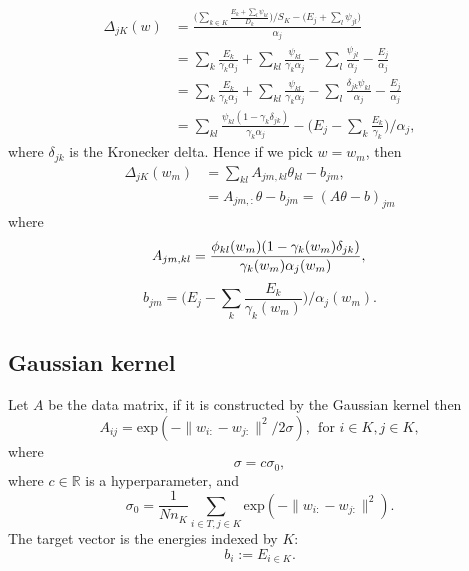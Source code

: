 \documentclass[12pt]{article}
\def\D{\displaystyle}
\begin{document}
\begin{equation}
	\label{eq:delta_split}
	\begin{split}
		\Delta_{jK}(w)&= \frac{\D \Big(\sum_{k\in K} \frac{E_k + \sum_l \psi_{kl}}{D_k} \Big)/ S_K - \Big(E_j + \sum_l \psi_{jl}\Big)}{\alpha_j} \\
		&= \sum_k \frac{E_k}{\gamma_k\alpha_j} + \sum_{kl} \frac{\psi_{kl}}{\gamma_k\alpha_j} - \sum_{l} \frac{\psi_{jl}}{\alpha_j} - \frac{E_j}{\alpha_j}\\
		&= \sum_k \frac{E_k}{\gamma_k\alpha_j} + \sum_{kl} \frac{\psi_{kl}}{\gamma_k\alpha_j} - \sum_{l} \frac{\delta_{jk}\psi_{kl}}{\alpha_j} - \frac{E_j}{\alpha_j}\\
		&= \sum_{kl} \frac{\psi_{kl} (1-\gamma_k\delta_{jk})}{\gamma_k\alpha_j} - \Big(E_j - \sum_k\frac{E_k}{\gamma_k}\Big)/\alpha_j,
	\end{split}
\end{equation}
where $\delta_{jk}$ is the Kronecker delta. Hence if we pick $w = w_m$, then
\begin{equation}
	\begin{split}
		\Delta_{jK}(w_m) &= \sum_{kl} A_{jm, kl} \theta_{kl} - b_{jm}, \\
		&= A_{jm,:}\theta - b_{jm} = (A\theta - b)_{jm}
	\end{split}	
\end{equation}
where
\begin{equation}
	A_{jm, kl} = \frac{\phi_{kl}(w_m)(1 - \gamma_k(w_m) \delta_{jk})}{\gamma_k(w_m) \alpha_j(w_m)},\\
\end{equation}
\begin{equation}
	b_{jm} = \Big(E_j - \sum_k\frac{E_k}{\gamma_k(w_m)}\Big)/\alpha_j(w_m).
\end{equation}

\subsection{Gaussian kernel}
\label{subsec:gaussian}
Let $A$ be the data matrix, if it is constructed by the Gaussian kernel then
\begin{equation}
	\label{eq:gaussian}
	A_{ij} = \text{exp}(-\|w_{i:} - w_{j:}\|^2 / 2\sigma), ~~\text{for }i \in K, j \in K,
\end{equation}
where
\begin{equation}
	\sigma = c\sigma_0,
\end{equation}
where $c \in \mathbb{R}$ is a hyperparameter, and
\begin{equation}
	\sigma_0 = \frac{1}{Nn_K}\sum_{i \in T, j \in K}\text{exp}(-\|w_{i:} - w_{j:}\|^2).
\end{equation} 
The target vector is the energies indexed by $K$:
\begin{equation}
	\label{eq:lineartargetvector}
	b_i := E_{i \in K}.
\end{equation}
\end{document}
